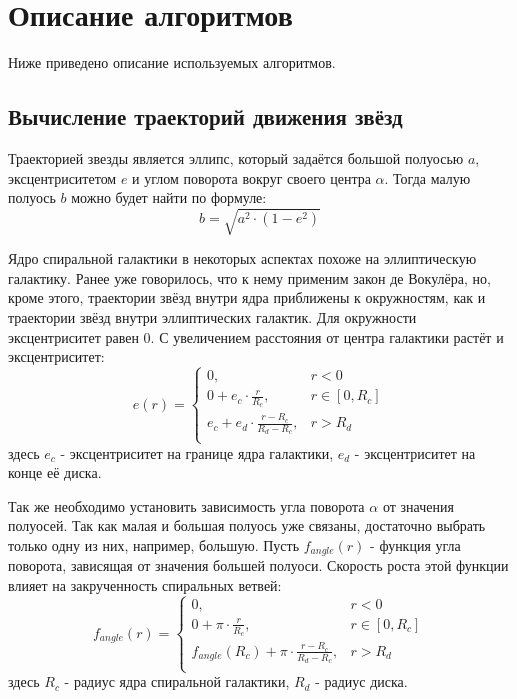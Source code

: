 \section{Описание алгоритмов}

Ниже приведено описание используемых алгоритмов.

\subsection{Вычисление траекторий движения звёзд}

Траекторией звезды является эллипс, который задаётся большой полуосью $a$, эксцентриситетом $e$ и углом поворота вокруг своего центра $\alpha{}$. Тогда малую полуось $b$ можно будет найти по формуле:
\begin{equation}
    b = \sqrt{a^2 \cdot{} (1 - e^2)}
\end{equation}

Ядро спиральной галактики в некоторых аспектах похоже на эллиптическую галактику. Ранее уже говорилось, что к нему применим закон де Вокулёра, но, кроме этого, траектории звёзд внутри ядра приближены к окружностям, как и траектории звёзд внутри эллиптических галактик. Для окружности эксцентриситет равен 0. С увеличением расстояния от центра галактики растёт и эксцентриситет:
\begin{equation}
    e(r) = \left\{ \begin{array}{ll}

    0, & \textrm{$r < 0$} \\
    0 + e_c \cdot{} \frac{r}{R_c}, & \textrm{$r \in [0, R_c]$} \\
    e_c + e_d \cdot{} \frac{r - R_c}{R_d - R_c}, & \textrm{$r > R_d$} \\

           \end{array} \right.
\end{equation}
здесь $e_c$ - эксцентриситет на границе ядра галактики, $e_d$ - эксцентриситет на конце её диска.

Так же необходимо установить зависимость угла поворота $\alpha{}$ от значения полуосей. Так как малая и большая полуось уже связаны, достаточно выбрать только одну из них, например, большую. Пусть $f_{angle}(r)$ - функция угла поворота, зависящая от значения большей полуоси. Скорость роста этой функции влияет на закрученность спиральных ветвей:
\begin{equation}
    f_{angle}(r) = \left\{ \begin{array}{ll}

    0, & \textrm{$r < 0$} \\
    0 + \pi{} \cdot{} \frac{r}{R_c}, & \textrm{$r \in [0, R_c]$} \\
    f_{angle}(R_c) + \pi{} \cdot{} \frac{r - R_c}{R_d - R_c}, & \textrm{$r > R_d$} \\

                   \end{array} \right.
\end{equation}
здесь $R_c$ - радиус ядра спиральной галактики, $R_d$ - радиус диска.

